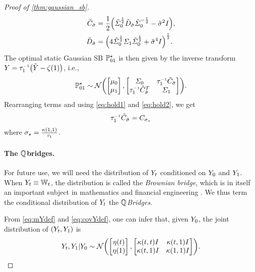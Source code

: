 \begin{proof}[Proof of \cref{thm:gaussian_sb}]
\begin{align}
\label{eq:hold1}
\tilde{C}_{\tilde{\sdev}} &=  \frac{1}{2}\parens*{\tcovar^{\frac{1}{2}} \tilde{D}_{\tilde{\sdev}} \tcovar^{-\frac{1}{2}} - \tilde{\sdev}^2\eye}, \\
\label{eq:hold2}
\tilde{D}_{\tilde{\sdev}} &= \parens*{ 4\tcovar^{\frac{1}{2}} \covaralt \tcovar^{\frac{1}{2}} +  \tilde{\sdev}^4\eye  }^{\frac{1}{2}}.
\end{align}
The optimal static Gaussian \acrshort{SB} $\Pstasol$ is then given by the inverse transform $Y = \aggtimeinv[\horizon] \parens*{\tilde{Y} - \tshift[\horizon]}$, i.e.,
\begin{align}
\label{eq:Pstasol}
\Pstasol \sim \Ncal \parens*{  \begin{bmatrix}
\m \\
\malt
\end{bmatrix},  \begin{bmatrix}
\covar &  \aggtimeinv[\horizon] \tilde{C}_{\tilde{\sdev}    } \\
\aggtimeinv[\horizon]\tilde{C}_{ \tilde{\sdev}}^T  & \covaralt
\end{bmatrix}}.
\end{align}Rearranging terms and using \eqref{eq:hold1} and \eqref{eq:hold2}, we get 
\begin{align}
\aggtimeinv[\horizon] \tilde{C}_{\tilde{\sdev}} = C_{\sdev_\star}
\end{align}where $\sdev_\star = \frac{\kernel[\horizon][\horizon]}{ \aggtime[\horizon] }$.


\paragraph{The $\refprobase$\textendash bridges.}

For future use, we will need the distribution of $\refsde$ conditioned on $\refsde[0]$ and $\refsde[\horizon]$. When $\refsde \equiv \Wiener$, the distribution is called the \emph{Brownian bridge}, which is in itself an important subject in mathematics and financial engineering \citep{mansuy2008aspects}. We thus term the conditional distribution of $\refsde$ the \emph{$\refprobase$\textendash Bridges}.

From \eqref{eq:mYdef} and \eqref{eq:covYdef}, one can infer that, given $\refsde[0]$, the joint distribution of $\parens*{\refsde,\refsde[\horizon]}$ is 
\begin{align}
\refsde,\refsde[\horizon] \vert \refsde[0] \sim  \Ncal \parens*{  \begin{bmatrix}
\mYcinit[\ctime] \\
\mYcinit[\horizon]
\end{bmatrix},  \begin{bmatrix}
\kernel[\ctime][\ctime] \eye &  \kernel[\ctime][\horizon]\eye \\
\kernel[\ctime][\horizon]\eye & \kernel[\horizon][\horizon]\eye
\end{bmatrix} }.
\end{align}


\end{proof}
